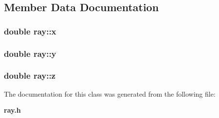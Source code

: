 \subsection{Member Data Documentation}
\subsubsection[{x}]{\setlength{\rightskip}{0pt plus 5cm}double {\bf ray::x}}\label{classray_e9f4259fab216f829be488908bf50658}


\subsubsection[{y}]{\setlength{\rightskip}{0pt plus 5cm}double {\bf ray::y}}\label{classray_d3da4a9ebe44c9977c7049f43be38d97}


\subsubsection[{z}]{\setlength{\rightskip}{0pt plus 5cm}double {\bf ray::z}}\label{classray_9b93204e6fe7898faa4b5c763a2175f1}




The documentation for this class was generated from the following file:\begin{CompactItemize}
\item 
{\bf ray.h}\end{CompactItemize}
